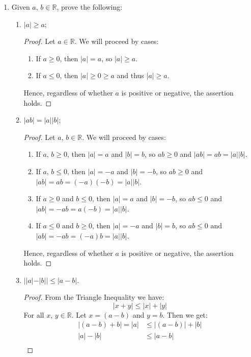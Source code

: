 \documentclass[12pt]{amsart}
\begin{document}
\begin{enumerate}
\item Given $a,\,b\in \mathbb R$, prove the following:
%
\begin{enumerate}

\item $|a|\geq a$;

\begin{proof}
Let $a\in \mathbb R$. We will proceed by cases:
\begin{enumerate}
\item If $a\geq 0$, then $|a|=a$, so $|a|\geq a$.
\item If $a\leq 0$, then $|a| \geq 0 \geq a$ and thus $|a| \geq a$.
\end{enumerate}
Hence, regardless of whether $a$ is positive or negative, the assertion holds.
\end{proof}

\item $|ab|=|a||b|$;

\begin{proof}
Let $a,\,b\in \mathbb R$. We will proceed by cases:
\begin{enumerate}
\item If $a,\,b\geq 0$, then $|a| = a$ and $|b|=b$, so $ab\geq 0$ and $|ab| = ab = |a||b|$.
\item If $a,\,b\leq 0$, then $|a| = -a$ and $|b|=-b$, so $ab\geq 0$ and $|ab| = ab = (-a)(-b)= |a||b|$.
\item If $a\geq 0$ and $b\leq 0$, then $|a| = a$ and $|b|=-b$, so $ab\leq 0$ and $|ab| = -ab = a(-b)= |a||b|$.
\item If $a\leq 0$ and $b\geq 0$, then $|a| = -a$ and $|b|=b$, so $ab\leq 0$ and $|ab| = -ab = (-a)b= |a||b|$.
\end{enumerate}
Hence, regardless of whether $a$ is positive or negative, the assertion holds.

\end{proof}

\item  $||a|-|b||\leq |a-b|$. 

\begin{proof}
From the Triangle Inequality we have:
\[ |x+y| \leq |x| + |y| \]
For all $x,\,y\in \mathbb R$. Let $x=(a-b)$ and $y=b$. Then we get: 
\begin{align*}
|(a-b)+b| = |a|& \leq |(a-b)| + |b| \\
|a| - |b|& \leq |a-b| \\
\end{align*}
\end{proof}
\end{enumerate}


\end{enumerate}
\end{document}
